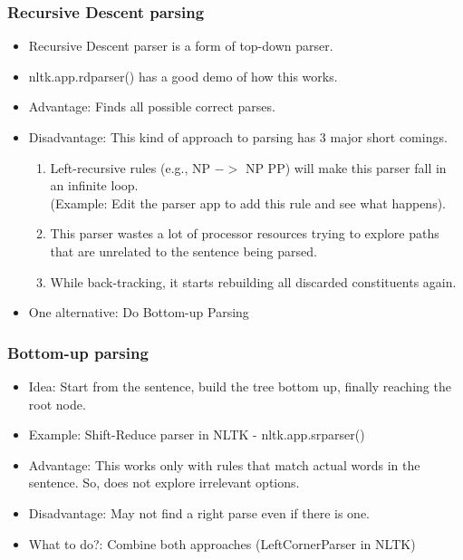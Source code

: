\documentclass{beamer}
\begin{document}
\begin{frame}
\frametitle{Recursive Descent parsing}
\begin{itemize}
\item Recursive Descent parser is a form of top-down parser.
\item nltk.app.rdparser() has a good demo of how this works. \pause
\item Advantage: Finds all possible correct parses.
\item Disadvantage: This kind of approach to parsing has 3 major short comings.
\begin{enumerate}
\item Left-recursive rules (e.g., NP $->$ NP PP) will make this parser fall in an infinite loop. \\ 
(Example: Edit the parser app to add this rule and see what happens).
\item This parser wastes a lot of processor resources trying to explore paths that are unrelated to the sentence being parsed.
\item While back-tracking, it starts rebuilding all discarded constituents again.
\end{enumerate}
\item One alternative: Do Bottom-up Parsing 
\end{itemize}
\end{frame}

\begin{frame}
\frametitle{Bottom-up parsing}
\begin{itemize}
\item Idea: Start from the sentence, build the tree bottom up, finally reaching the root node.
\item Example: Shift-Reduce parser in NLTK - nltk.app.srparser() \pause
\item Advantage: This works only with rules that match actual words in the sentence. So, does not explore irrelevant options.
\item Disadvantage: May not find a right parse even if there is one. 
\item What to do?: Combine both approaches (LeftCornerParser in NLTK)
\end{itemize}
\end{frame}
\end{document}
